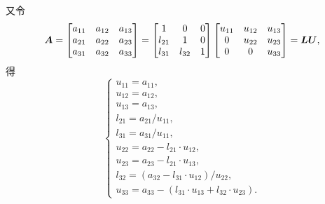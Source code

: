 又令\begin{equation*}
	\boldsymbol{A} = \begin{bmatrix}
		a_{11} & a_{12} & a_{13} \\
		a_{21} & a_{22} & a_{23} \\
		a_{31} & a_{32} & a_{33}
	\end{bmatrix}
	= \begin{bmatrix}
		1 & 0 & 0 \\
		l_{21} & 1 & 0 \\
		l_{31} & l_{32} & 1
	\end{bmatrix}
	\begin{bmatrix}
		u_{11} & u_{12} & u_{13} \\
		0 & u_{22} & u_{23} \\
		0 & 0 & u_{33}
	\end{bmatrix} = \boldsymbol{L} \boldsymbol{U},
\end{equation*}
得\begin{equation*}
	\left\{\begin{array}{l}
		u_{11} = a_{11}, \\
		u_{12} = a_{12}, \\
		u_{13} = a_{13}, \\
		l_{21} = a_{21} / u_{11}, \\
		l_{31} = a_{31} / u_{11}, \\
		u_{22} = a_{22} - l_{21} \cdot u_{12}, \\
		u_{23} = a_{23} - l_{21} \cdot u_{13}, \\
		l_{32} = (a_{32} - l_{31} \cdot u_{12}) / u_{22}, \\
		u_{33} = a_{33} - (l_{31} \cdot u_{13} + l_{32} \cdot u_{23}).
	\end{array}\right.
\end{equation*}


